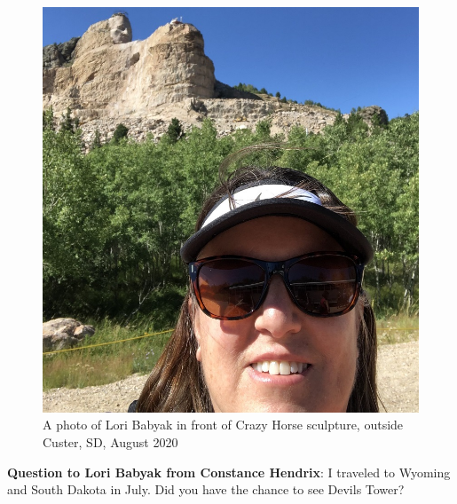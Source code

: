 \begin{figure} [h!]
    \centering
    \includegraphics[width=.4\textwidth]{LoriSDSmall.JPG} 
    \caption{A photo of Lori Babyak in front of Crazy Horse sculpture, outside Custer, SD, August 2020}
\end{figure}


\textbf{Question  to Lori Babyak from Constance Hendrix}:  I traveled to Wyoming and South Dakota in July.  Did you have the chance to see Devils Tower?
